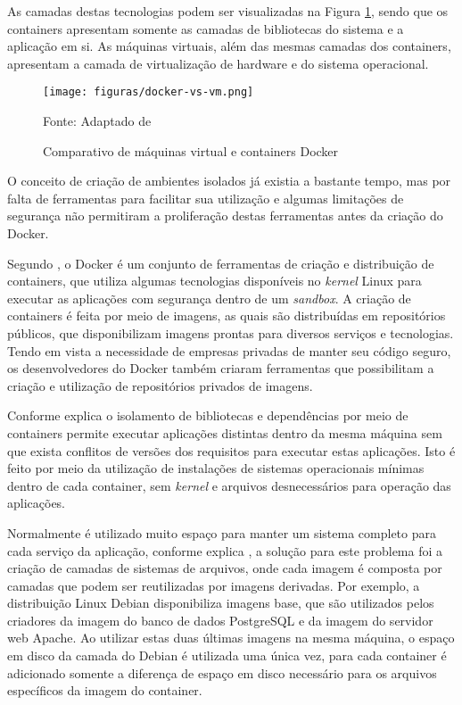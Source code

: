 As camadas destas tecnologias podem ser visualizadas na Figura
\ref{fig:docker-vs-vm}, sendo que os containers apresentam somente as camadas
de bibliotecas do sistema e a aplicação em si. As máquinas virtuais, além das
mesmas camadas dos containers, apresentam a camada de virtualização de
hardware e do sistema operacional.

\begin{figure}[H]
	\centering
    \caption{Comparativo de máquinas virtual e containers Docker}
	\texttt{[image: figuras/docker-vs-vm.png]}

	\label{fig:docker-vs-vm}
	\footnotesize Fonte: Adaptado de 
\end{figure}

O conceito de criação de ambientes isolados já existia a bastante tempo, mas
por falta de ferramentas para facilitar sua utilização e algumas limitações
de segurança não permitiram a proliferação destas ferramentas antes da criação
do Docker.

Segundo , o Docker é um conjunto de ferramentas de
criação e distribuição de containers, que utiliza algumas tecnologias
disponíveis no \emph{kernel} Linux para executar as aplicações com segurança
dentro de um \emph{sandbox}. A criação de containers é feita por meio de
imagens, as quais são distribuídas em repositórios públicos, que
disponibilizam imagens prontas para diversos serviços e tecnologias. Tendo
em vista a necessidade de empresas privadas de manter seu código seguro,
os desenvolvedores do Docker também criaram ferramentas que possibilitam a
criação e utilização de repositórios privados de imagens.

Conforme explica  o isolamento de bibliotecas e
dependências por meio de containers permite executar aplicações distintas
dentro da mesma máquina sem que exista conflitos de versões dos requisitos
para executar estas aplicações. Isto é feito por meio da utilização de
instalações de sistemas operacionais mínimas dentro de cada container, sem
\emph{kernel} e arquivos desnecessários para operação das aplicações.

Normalmente é utilizado muito espaço para manter um sistema completo para
cada serviço da aplicação, conforme explica , a
solução para este problema foi a criação de camadas de sistemas de arquivos,
onde cada imagem é composta por camadas que podem ser reutilizadas por imagens
derivadas. Por exemplo, a distribuição Linux Debian disponibiliza imagens
base, que são utilizados pelos criadores da imagem do banco de dados
PostgreSQL e da imagem do servidor web Apache. Ao utilizar estas duas últimas
imagens na mesma máquina, o espaço em disco da camada do Debian é utilizada
uma única vez, para cada container é adicionado somente a diferença de
espaço em disco necessário para os arquivos específicos da imagem do container.

